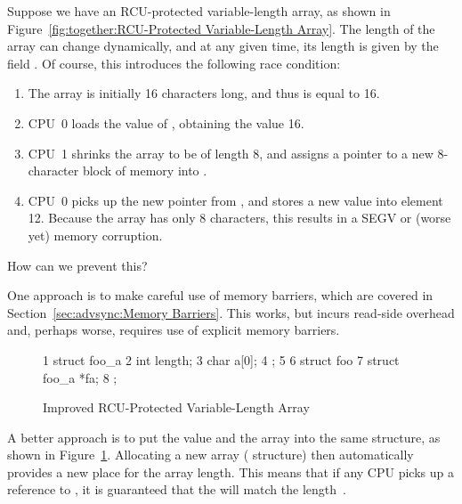 Suppose we have an RCU-protected variable-length array, as shown in
Figure~\ref{fig:together:RCU-Protected Variable-Length Array}.
The length of the array  can change dynamically, and at any
given time, its length is given by the field .
Of course, this introduces the following race condition:

\begin{enumerate}
\item	The array is initially 16 characters long, and thus 
	is equal to 16.
\item	CPU~0 loads the value of , obtaining the value 16.
\item	CPU~1 shrinks the array to be of length 8, and assigns a pointer
	to a new 8-character block of memory into .
\item	CPU~0 picks up the new pointer from , and stores a
	new value into element 12.
	Because the array has only 8 characters, this results in
	a SEGV or (worse yet) memory corruption.
\end{enumerate}

How can we prevent this?

One approach is to make careful use of memory barriers, which are
covered in Section~\ref{sec:advsync:Memory Barriers}.
This works, but incurs read-side overhead and, perhaps worse, requires
use of explicit memory barriers.

\begin{figure}[tbp]
{ \scriptsize
\begin{verbbox}
 1 struct foo_a {
 2   int length;
 3   char a[0];
 4 };
 5 
 6 struct foo {
 7   struct foo_a *fa;
 8 };
\end{verbbox}
}
\centering
\theverbbox
\caption{Improved RCU-Protected Variable-Length Array}
\label{fig:together:Improved RCU-Protected Variable-Length Array}
\end{figure}

A better approach is to put the value and the array into the same structure,
as shown in
Figure~\ref{fig:together:Improved RCU-Protected Variable-Length Array}.
Allocating a new array ( structure) then automatically provides
a new place for the array length.
This means that if any CPU picks up a reference to , it is
guaranteed that the  will match the 
length~\cite{Arcangeli03}.

